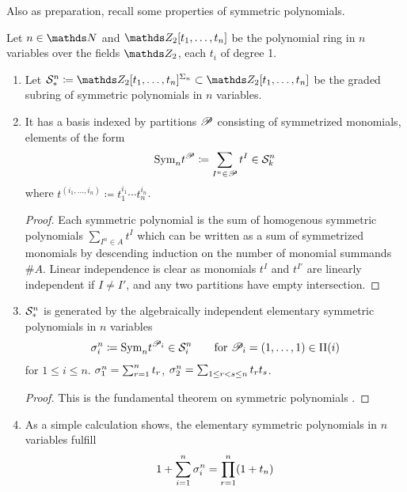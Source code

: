 Also as preparation, recall some properties of symmetric polynomials.
\begin{LemDef}
  Let $n\in\Nat$ and $\Zmod2[t_1,\dotsc,t_n]$ be the polynomial ring
  in $n$ variables over the fields $\Zmod2$, each $t_i$ of degree 1.
  \begin{enumerate}
  \item Let
    $\Symm{n}_*
    \coloneqq \Zmod2[t_1,\dotsc,t_n]^{\Permutations{n}}
    \subset \Zmod2[t_1,\dotsc,t_n]$
    be the graded subring of symmetric polynomials in $n$ variables.
  \item It has a basis indexed by partitions $\mathscr{P}$ consisting of
    symmetrized monomials, \idest elements of the form
    \begin{gather*}
      \text{\normalfont Sym}_{n} t^{\mathscr{P}} \coloneqq \sum_{I^n\in\mathscr{P}} t^I \in \mathcal{S}^{n}_k
    \end{gather*}
    where $t^{(i_1,\dotsc,i_n)}\coloneqq t_1^{i_1}\dotsm t_n^{i_n}$.
    \begin{proof}
      Each symmetric polynomial is the sum of homogenous symmetric
      polynomials $\sum_{I^n\in A}t^I$ which can be written as a sum
      of symmetrized monomials by descending induction on the number
      of monomial summands $\#A$.
      Linear independence is clear as monomials $t^I$ and $t^{I'}$ are
      linearly independent if $I\neq I'$, and any two partitions have
      empty intersection.
    \end{proof}
  \item $\mathcal{S}^{n}_*$ is generated by the algebraically independent
    elementary symmetric polynomials in $n$ variables
    \begin{gather*}
      \sigma_{i}^{n}\coloneqq \text{\normalfont Sym}_{n} t^{\mathscr{P}_i}
      \in \mathcal{S}^{n}_i
      \qquad \text{for }
      \mathscr{P}_i = (1,\dotsc,1)
      \in \Pi({i})
    \end{gather*}
    for $1\leq i\leq n$.
    \Forexample
    $\sigma_{1}^{n}=\sum_{r=1}^{n}t_r$,
    $\sigma_{2}^{n}=\sum_{1\leq r<s\leq n} t_r t_s$.
    \begin{proof}
      This is the fundamental theorem on symmetric polynomials
      \cite[Chapter~4.4, Satz~1]{bosch2013algebra}.
    \end{proof}
  \item As a simple calculation shows, the elementary symmetric
    polynomials in $n$ variables fulfill
    \begin{gather}\label{eq:sumelemsymmpoly}
      1 + \sum_{i=1}^{n} \sigma_{i}^{n}
      = \prod_{r=1}^{n}(1+t_n)
    \end{gather}
  \end{enumerate}
\end{LemDef}

